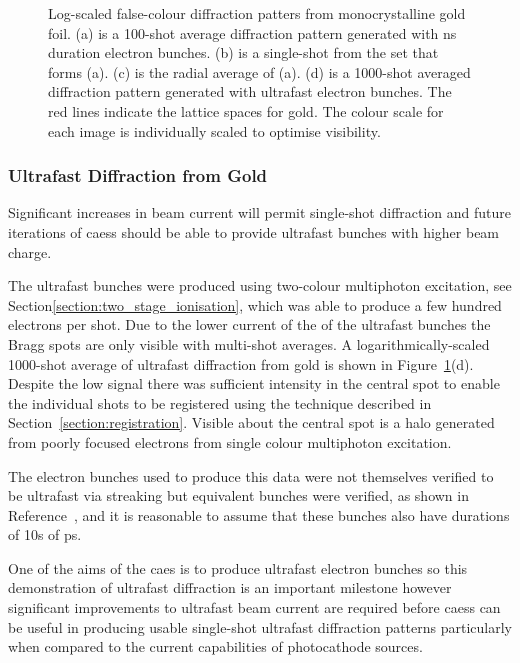 \begin{figure}
    \center
    
    \caption{Log-scaled false-colour diffraction patters from monocrystalline gold foil. (a) is a 100-shot average diffraction pattern generated with ns duration electron bunches. (b) is a single-shot from the set that forms (a). (c) is the radial average of (a). (d) is a 1000-shot averaged diffraction pattern generated with ultrafast electron bunches. The red lines indicate the lattice spaces for gold. The colour scale for each image is individually scaled to optimise visibility.}
    \label{figure:au_diffraction}
\end{figure}

\subsubsection{Ultrafast Diffraction from Gold}

Significant increases in beam current will permit single-shot diffraction and future iterations of \glspl{caes} should be able to provide ultrafast bunches with higher beam charge.

The ultrafast bunches were produced using two-colour multiphoton excitation, see Section\ref{section:two_stage_ionisation}, which was able to produce a few hundred electrons per shot.
Due to the lower current of the of the ultrafast bunches the Bragg spots are only visible with multi-shot averages.
A logarithmically-scaled 1000-shot average of ultrafast diffraction from gold is shown in Figure~\ref{figure:au_diffraction}(d).
Despite the low signal there was sufficient intensity in the central spot to enable the individual shots to be registered using the technique described in Section~\ref{section:registration}.
Visible about the central spot is a halo generated from poorly focused electrons from single colour multiphoton excitation.

The electron bunches used to produce this data were not themselves verified to be ultrafast via streaking but equivalent bunches were verified, as shown in Reference~\cite{speirs_identification_2017}, and it is reasonable to assume that these bunches also have durations of 10s of ps.

One of the aims of the \gls{caes} is to produce ultrafast electron bunches so this demonstration of ultrafast diffraction is an important milestone however significant improvements to ultrafast beam current are required before \glspl{caes} can be useful in producing usable single-shot ultrafast diffraction patterns particularly when compared to the current capabilities of photocathode sources.

